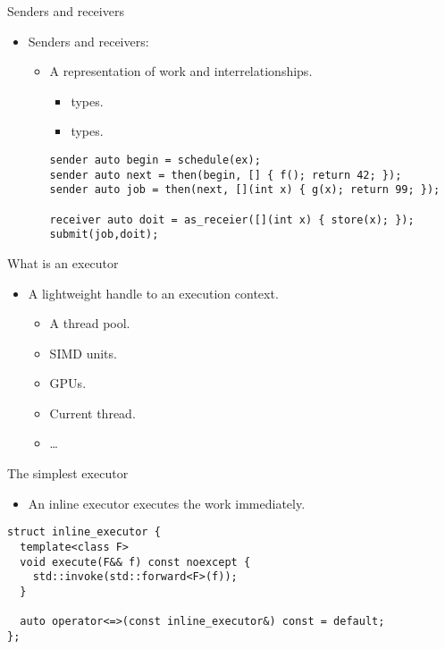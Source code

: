 \begin{frame}[t,fragile]{Senders and receivers}
\begin{itemize}
  \item Senders and receivers:
    \begin{itemize}
      \item A representation of work and interrelationships.
        \begin{itemize}
          \item {} types.
          \item {} types.
        \end{itemize}
\begin{lstlisting}
sender auto begin = schedule(ex);
sender auto next = then(begin, [] { f(); return 42; });
sender auto job = then(next, [](int x) { g(x); return 99; });

receiver auto doit = as_receier([](int x) { store(x); });
submit(job,doit);
\end{lstlisting}
    \end{itemize}
\end{itemize}
\end{frame}

\begin{frame}[t]{What is an executor}
\begin{itemize}
  \item A lightweight handle to an execution context.
    \begin{itemize}
      \item A thread pool.
      \item SIMD units.
      \item GPUs.
      \item Current thread.
      \item \ldots
    \end{itemize}
\end{itemize}
\end{frame}

\begin{frame}[t,fragile]{The simplest executor}
\begin{itemize}
  \item An inline executor executes the work immediately.
\end{itemize}
\begin{lstlisting}
struct inline_executor {
  template<class F>
  void execute(F&& f) const noexcept {
    std::invoke(std::forward<F>(f));
  }

  auto operator<=>(const inline_executor&) const = default;
};
\end{lstlisting}
\end{frame}

